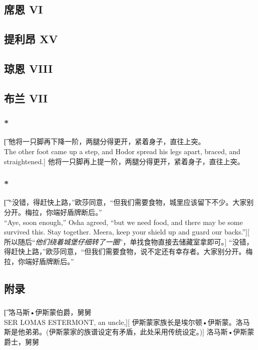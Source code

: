 \documentclass[12pt,a4paper]{article}
\begin{document}
\subsection{席恩 VI}

\subsection{提利昂 XV}

\subsection{琼恩 VIII}

\subsection{布兰 VII}
\subsubsection{\color{red}*}\t[
	他将一只脚再下降一阶，两腿分得更开，紧着身子，直往上突。\\
	The other foot came up a step, and Hodor spread his legs apart, braced, and straightened.]
	他将一只脚再上提一阶，两腿分得更开，紧着身子，直往上突。
	
\subsubsection{\color{red}*}\t[
	“没错，得赶快上路，”欧莎同意，“但我们需要食物，城里应该留下不少。大家别分开。梅拉，你端好盾牌断后。”\\
	“Aye, soon enough,” Osha agreed, “but we need food, and there may be some survived this. Stay together. Meera, keep your shield up and guard our backs.”][
	所以随后“\emph{他们绕着城堡仔细转了一圈}”，单找食物直接去储藏室拿即可。]
	“没错，得赶快上路，”欧莎同意，“但我们需要食物，说不定还有幸存者。大家别分开。梅拉，你端好盾牌断后。”
	
\subsection{附录}	
\subsubsection{}\t[
	{\large 洛马斯•伊斯蒙伯爵}，舅舅\\
	SER LOMAS ESTERMONT, an uncle,][
	伊斯蒙家族长是埃尔顿•伊斯蒙。洛马斯是他弟弟。(伊斯蒙家的族谱设定有矛盾，此处采用传统设定。)]
	{\large 洛马斯•伊斯蒙爵士}，舅舅
\end{document}
